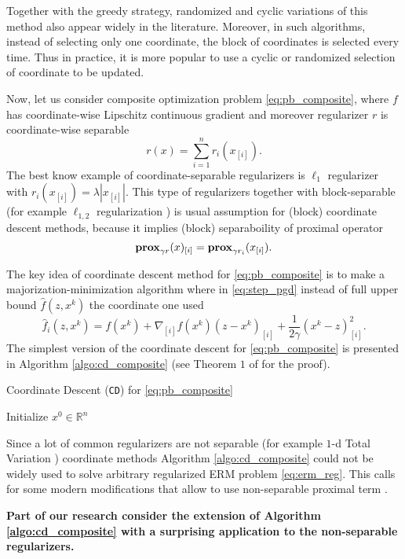 Together with the greedy strategy, randomized and cyclic variations of this method also appear widely in the literature. Moreover, in such algorithms, instead of selecting only one coordinate, the block of coordinates is selected every time. Thus in practice, it is more popular to use a cyclic or randomized selection of coordinate to be updated.

Now, let us consider composite optimization problem \eqref{eq:pb_composite}, where $f$ has coordinate-wise Lipschitz continuous gradient and moreover regularizer $r$ is coordinate-wise separable
$$
r(x) = \sum_{i=1}^nr_i(x_{[i]}).
$$
The best know example of coordinate-separable regularizers is $\ell_1$ regularizer with $r_i(x_{[i]}) = \lambda |x_{[i]}|$. This type of regularizers together with block-separable (for example $\ell_{1,2}$ regularization \cite{bach2012optimization}) is usual assumption for (block) coordinate descent methods, because it implies (block) separaboility of proximal operator
$$
\mathbf{prox}_{\gamma r}(x)_{[i]} = \mathbf{prox}_{\gamma r_i}(x_{[i]}).
$$

The key idea of coordinate descent method for \eqref{eq:pb_composite} is to make a majorization-minimization algorithm where in \eqref{eq:step_pgd} instead of full upper bound $\hat{f}(z, x^k)$ the coordinate one used
$$
\hat{f}_i(z, x^k) = f(x^k) + \nabla_{[i]} f(x^k) (z-x^k)_{[i]}+\frac{1}{2\gamma}(x^k-z)_{[i]}^2.
$$
The simplest version of the coordinate descent for \eqref{eq:pb_composite} is presented in Algorithm \ref{algo:cd_composite} (see Theorem $1$ of \cite{richtarik2012efficient} for the proof).

\begin{algorithm}
    \caption{Coordinate Descent (\texttt{CD}) for \eqref{eq:pb_composite}}
    \label{algo:cd_composite}
    \begin{algorithmic}
        \STATE Initialize $x^0\in\mathbb{R}^n$
        \ENDFOR
    \end{algorithmic}
\end{algorithm}

Since a lot of common regularizers are not separable (for example $1$-d Total Variation \cite{bach2012optimization}) coordinate methods Algorithm \ref{algo:cd_composite} could not be widely used to solve arbitrary regularized ERM problem \eqref{eq:erm_reg}. This calls for some modern modifications that allow to use non-separable proximal term \cite{hanzely2018sega}. 

{\textbf{Part of our research consider the extension of Algorithm \ref{algo:cd_composite} with a surprising application to the non-separable regularizers.}}
